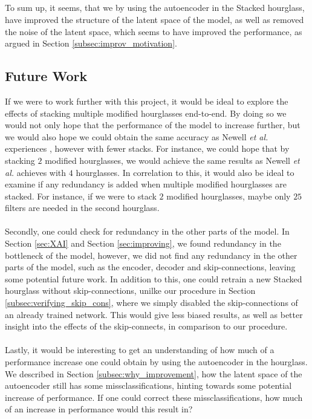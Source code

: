 \documentclass[./main.tex]{subfiles}
\begin{document}
\\
\\
\\
\\
To sum up, it seems, that we by using the autoencoder in the Stacked hourglass, have improved the structure of the latent space of the model, as well as removed the noise of the latent space, which seems to have improved the performance, as argued in Section \ref{subsec:improv_motivation}.

\subsection{Future Work}\label{subsec:Future_work}
If we were to work further with this project, it would be ideal to explore the effects of stacking multiple modified hourglasses end-to-end. By doing so we would not only hope that the performance of the model to increase further, but we would also hope we could obtain the same accuracy as Newell \textit{et al.} experiences \cite{Newell}, however with fewer stacks. For instance, we could hope that by stacking $2$ modified hourglasses, we would achieve the same results as Newell \textit{et al.}  \cite{Newell} achieves with $4$ hourglasses. In correlation to this, it would also be ideal to examine if any redundancy is added when multiple modified hourglasses are stacked. For instance, if we were to stack $2$ modified hourglasses, maybe only $25$ filters are needed in the second hourglass.
\\
\\
Secondly, one could check for redundancy in the other parts of the model. In Section \ref{sec:XAI} and Section \ref{sec:improving}, we found redundancy in the bottleneck of the model, however, we did not find any redundancy in the other parts of the model, such as the encoder, decoder and skip-connections, leaving some potential future work. In addition to this, one could retrain a new Stacked hourglass without skip-connections, unilke our procedure in Section \ref{subsec:verifying_skip_cons}, where we simply disabled the skip-connections of an already trained network. This would give less biased results, as well as better insight into the effects of the skip-connects, in comparison to our procedure.
\\
\\
Lastly, it would be interesting to get an understanding of how much of a performance increase one could obtain by using the autoencoder in the hourglass. We described in Section \ref{subsec:why_improvement}, how the latent space of the autoencoder still has some missclassifications, hinting towards some potential increase of performance. If one could correct these missclassifications, how much of an increase in performance would this result in?
\end{document}
